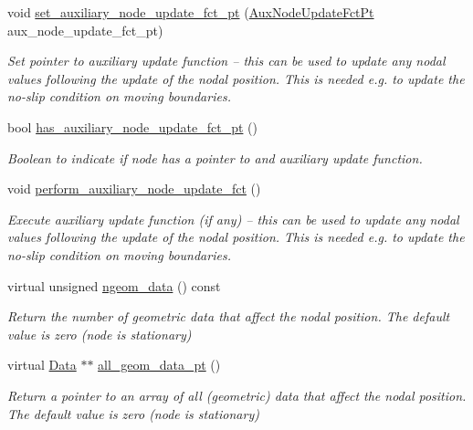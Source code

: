 \begin{DoxyCompactItemize}
void \hyperlink{classoomph_1_1Node_a638898508d6adc170afb1a2a203ac707}{set\+\_\+auxiliary\+\_\+node\+\_\+update\+\_\+fct\+\_\+pt} (\hyperlink{classoomph_1_1Node_afcc4cc3e1e48964baf23fa44c98293a9}{Aux\+Node\+Update\+Fct\+Pt} aux\+\_\+node\+\_\+update\+\_\+fct\+\_\+pt)
\begin{DoxyCompactList}\small\item\em Set pointer to auxiliary update function -- this can be used to update any nodal values following the update of the nodal position. This is needed e.\+g. to update the no-\/slip condition on moving boundaries. \end{DoxyCompactList}\item 
bool \hyperlink{classoomph_1_1Node_ad5fe8ac9dcb705612903bc6945926375}{has\+\_\+auxiliary\+\_\+node\+\_\+update\+\_\+fct\+\_\+pt} ()
\begin{DoxyCompactList}\small\item\em Boolean to indicate if node has a pointer to and auxiliary update function. \end{DoxyCompactList}\item 
void \hyperlink{classoomph_1_1Node_a6c287aa85c19f2d37ed7952ece5c76dd}{perform\+\_\+auxiliary\+\_\+node\+\_\+update\+\_\+fct} ()
\begin{DoxyCompactList}\small\item\em Execute auxiliary update function (if any) -- this can be used to update any nodal values following the update of the nodal position. This is needed e.\+g. to update the no-\/slip condition on moving boundaries. \end{DoxyCompactList}\item 
virtual unsigned \hyperlink{classoomph_1_1Node_ad20302b7992437075d3ca42390b39f24}{ngeom\+\_\+data} () const
\begin{DoxyCompactList}\small\item\em Return the number of geometric data that affect the nodal position. The default value is zero (node is stationary) \end{DoxyCompactList}\item 
virtual \hyperlink{classoomph_1_1Data}{Data} $\ast$$\ast$ \hyperlink{classoomph_1_1Node_a76d3081bdc3407744e6d8631a613d780}{all\+\_\+geom\+\_\+data\+\_\+pt} ()
\begin{DoxyCompactList}\small\item\em Return a pointer to an array of all (geometric) data that affect the nodal position. The default value is zero (node is stationary) \end{DoxyCompactList}\item 
$$
\end{DoxyCompactItemize}
